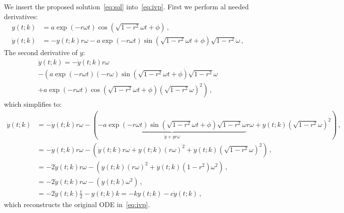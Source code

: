 \documentclass[utf8,english,DIV=12]{scrartcl}
\begin{document}
We insert the proposed solution~\eqref{eq:sol} into~\eqref{eq:ivp}. First we perform al needed derivatives:
\begin{equation}
  \begin{split}
    y(t;k)&=a\exp(-r\omega t)\cos(\sqrt{1-r^2}\omega t+\phi)\,,\\
    \dot y(t;k)&=-y(t;k)r\omega - a\exp(-r\omega t)\sin(\sqrt{1-r^2}\omega t+\phi) \sqrt{1-r^2}\omega\,,
  \end{split}\label{eq:proof}
\end{equation}
The second derivative of $y$:
\begin{multline}
  \ddot y(t;k)=-\dot y(t;k) r\omega \\
  - \left(a\exp(-r\omega t)(-r\omega)\sin(\sqrt{1-r^2}\omega t+\phi) \sqrt{1-r^2}\omega\right.\\
  + \left.a\exp(-r\omega t)\cos(\sqrt{1-r^2}\omega t+\phi) \left(\sqrt{1-r^2}\omega\right)^2\right)\,,  
\end{multline}
which simplifies to:
\begin{equation}
  \label{eq:ddoty}
  \begin{split}
  \ddot y(t;k)&=-\dot y(t;k) r\omega - \left(\underbrace{-a\exp(-r\omega t)\sin(\sqrt{1-r^2}\omega t+\phi)\sqrt{1-r^2}\omega}_{\dot y + yr\omega}   r\omega
    + y(t;k) \left(\sqrt{1-r^2}\omega\right)^2\right)\,, \\
  &=-\dot y(t;k) r\omega - \left(\dot y(t;k)r\omega + y(t;k)(r\omega)^2 
    + y(t;k) \left(\sqrt{1-r^2}\omega\right)^2\right)\,,\\
  &=-2\dot y(t;k) r\omega - \left(y(t;k)(r\omega)^2 
    + y(t;k) (1-r^2)\omega^2\right)\,,\\
  &=-2\dot y(t;k) r\omega - \left(y(t;k)\omega^2\right)\,,\\
  &=-2\dot y(t;k) \frac{c}{2} - y(t;k)k = - k y(t;k) - c\dot y(t;k)\,,
\end{split}
\end{equation}
which reconstructs the original ODE in~\eqref{eq:ivp}.
\end{document}
